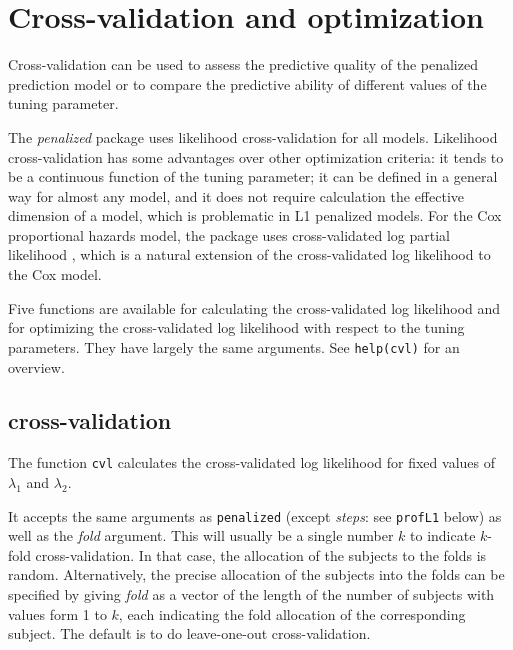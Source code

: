 \documentclass[a4paper]{article}
\newcommand{\Robject}[1]{{\texttt{#1}}}
\newcommand{\Rfunction}[1]{{\texttt{#1}}}
\newcommand{\Rpackage}[1]{{\textit{#1}}}
\newcommand{\Rfunarg}[1]{{\textit{#1}}}
\begin{document}
\section{Cross-validation and optimization} \label{cv}

Cross-validation can be used to assess the predictive quality of the penalized prediction model or to compare the predictive ability of different values of the tuning parameter.

The \Rpackage{penalized} package uses likelihood cross-validation for all models. Likelihood cross-validation has some advantages over other optimization criteria: it tends to be a continuous function of the tuning parameter; it can be defined in a general way for almost any model, and it does not require calculation the effective dimension of a model, which is problematic in L1 penalized models. For the Cox proportional hazards model, the package uses cross-validated log partial likelihood \citep{Verweij1993}, which is a natural extension of the cross-validated log likelihood to the Cox model.

Five functions are available for calculating the cross-validated log likelihood and for optimizing the cross-validated log likelihood with respect to the tuning parameters. They have largely the same arguments. See \Robject{help(cvl)} for an overview.


\subsection{cross-validation}

The function \Rfunction{cvl} calculates the cross-validated log likelihood for fixed values of $\lambda_1$ and $\lambda_2$.

It accepts the same arguments as \Rfunction{penalized} (except \Rfunarg{steps}: see \Rfunction{profL1} below) as well as the \Rfunarg{fold} argument. This will usually be a single number $k$ to indicate $k$-fold cross-validation. In that case, the allocation of the subjects to the folds is random. Alternatively, the precise allocation of the subjects into the folds can be specified by giving \Rfunarg{fold} as a vector of the length of the number of subjects with values form 1 to $k$, each indicating the fold allocation of the corresponding subject. The default is to do leave-one-out cross-validation.
\end{document}
